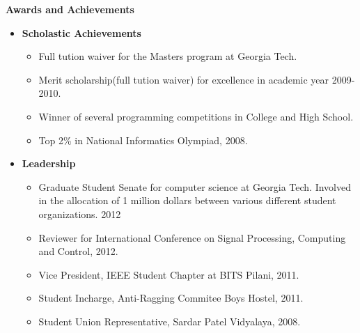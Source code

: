 \documentclass[letterpaper,9pt]{article}
\newcommand{\resitem}[1]{\item #1 \vspace{-2pt}}
\newcommand{\resheading}[1]{{ \colorbox{mygrey}{\begin{minipage}{\textwidth}{\textbf{#1 \vphantom{p\^{E}}}}\end{minipage}}}}
\begin{document}

\resheading{Awards and Achievements}
	\vspace{-13pt}
	\begin{itemize}
		\item 
			\textbf{Scholastic Achievements}
			\vspace{-5pt}
				{ \small
				\begin{itemize}
					\resitem{Full tution waiver for the Masters program at Georgia Tech.}
					\resitem{Merit scholarship(full tution waiver) for excellence in academic year 2009-2010.}
					\resitem{Winner of several programming competitions in College and High School.}
					\resitem{Top 2\% in National Informatics Olympiad, 2008.}
				\end{itemize}
				}
		\item 
			\textbf{Leadership}
			\vspace{-5pt}
				{ \small
				\begin{itemize}
					\resitem{Graduate Student Senate for computer science at Georgia Tech. Involved in the allocation of 1 million dollars between various different student organizations. 2012}
					\resitem{Reviewer for International Conference on Signal Processing, Computing and Control, 2012.}
					\resitem{Vice President, IEEE Student Chapter at BITS Pilani, 2011.}
					\resitem{Student Incharge, Anti-Ragging Commitee Boys Hostel, 2011.}
					\resitem{Student Union Representative, Sardar Patel Vidyalaya, 2008.}
				\end{itemize}
				}
	\end{itemize}
		
	
\end{document}
